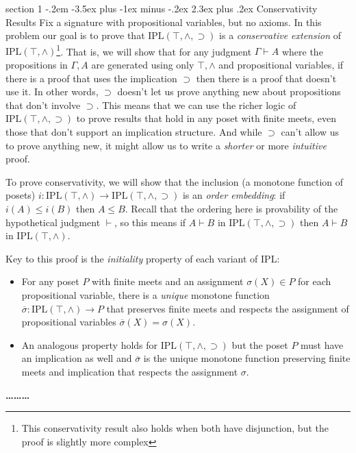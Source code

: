\documentclass[12pt]{article}
\makeatletter
\newenvironment{problem}{\@startsection
       {section}
       {1}
       {-.2em}
       {-3.5ex plus -1ex minus -.2ex}
       {2.3ex plus .2ex}
       {\pagebreak[3]%
       \large\bf\noindent{Problem }
       }
       }
       {%
       \begin{center}\large\bf \ldots\ldots\ldots\end{center}}
\newcommand{\meet}{\wedge}
\newcommand{\iplmeets}{\textrm{IPL}(\top,\meet)}
\newcommand{\iplneg}{\textrm{IPL}(\top,\meet,\supset)}
\makeatother
\begin{document}
\begin{problem}{Conservativity Results}
  Fix a signature with propositional variables, but no axioms. In this
  problem our goal is to prove that $\iplneg$ is a \emph{conservative
  extension} of $\iplmeets$\footnote{This conservativity result also
  holds when both have disjunction, but the proof is slightly more
  complex}. That is, we will show that for any judgment $\Gamma \vdash
  A$ where the propositions in $\Gamma, A$ are generated using only
  $\top, \wedge$ and propositional variables, if there is a proof that
  uses the implication $\supset$ then there is a proof that doesn't
  use it. In other words, $\supset$ doesn't let us prove anything new
  about propositions that don't involve $\supset$. This means that we
  can use the richer logic of $\iplneg$ to prove results that hold in
  any poset with finite meets, even those that don't support an
  implication structure. And while $\supset$ can't allow us to prove
  anything new, it might allow us to write a \emph{shorter} or more
  \emph{intuitive} proof.

  To prove conservativity, we will show that the inclusion (a monotone
  function of posets) $i : \iplmeets \to \iplneg$ is an \emph{order
  embedding}: if $i(A) \leq i(B)$ then $A \leq B$. Recall that the
  ordering here is provability of the hypothetical judgment $\vdash$,
  so this means if $A \vdash B$ in $\iplneg$ then $A \vdash B$ in
  $\iplmeets$.

  Key to this proof is the \emph{initiality} property of each variant of IPL:
  \begin{itemize}
  \item For any poset $P$ with finite meets and an assignment
    $\sigma(X) \in P$ for each propositional variable, there is a
    \emph{unique} monotone function $\overline \sigma : \iplmeets \to P$
    that preserves finite meets and respects the assignment of
    propositional variables $\overline \sigma(X) = \sigma(X)$.
  \item An analogous property holds for $\iplneg$
    but the poset $P$ must have an implication as well and $\overline
    \sigma$ is the unique monotone function preserving finite meets and implication that
    respects the assignment $\sigma$.
  \end{itemize}


\end{problem}
\end{document}

